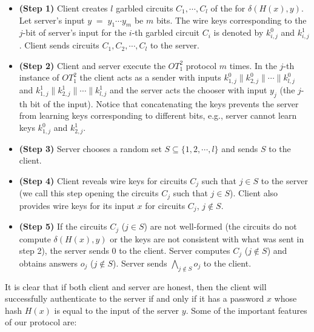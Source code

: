 \begin{itemize}

\item {\bf (Step 1)}  Client creates $l$ garbled circuits $C_1,\cdots,C_l$ of the  for $\delta (H(x), y)$. Let server's 
input $y \; = \; y_1 \cdots y_m$ be $m$ bits. The wire keys corresponding
to the $j$-bit of server's input for the $i$-th garbled circuit $C_i$
is denoted by $k^0_{i,j}$ and $k^1_{i,j}$. Client sends circuits
$C_1,C_2,\cdots,C_l$ to the server.

\item {\bf (Step 2)} Client and server execute the $OT_1^2$ protocol $m$ times. In the $j$-th instance of $OT_1^2$ the
client acts as a sender with inputs $k^0_{1,j} \| k^0_{2,j} \| \cdots
\| k^0_{l,j}$ and $k^1_{1,j} \| k^1_{2,j} \| \cdots \| k^1_{l,j}$ and
the server acts the chooser with input $y_j$ (the $j$-th bit of the
input). Notice that concatenating the keys prevents the server from
learning keys corresponding to different bits, e.g., server cannot
learn keys $k^0_{1,j}$ and $k^1_{2,j}$.

\item {\bf (Step 3)} Server chooses a random set $S \subseteq \{ 1,2, \cdots , l \}$ and sends $S$ to the client.

\item {\bf (Step 4)} Client reveals wire keys for circuits $C_j$ such that $j \in S$ to the server (we call this step opening the
circuits $C_j$ such that $j \in S$). Client also provides wire keys for its input $x$ for circuits $C_j$, $j \not\in S$.

\item {\bf (Step 5)} If the circuits $C_j$ ($j \in S$) are not well-formed (the circuits do not compute $\delta (H(x),y)$ or the 
keys are not consistent with what was sent in step 2), the server
sends $0$ to the client. Server computes $C_j$ ($j \not\in S$) and
obtains answers $o_j$ ($j \not\in S$). Server sends $\bigwedge_{j
\not\in S} o_j$ to the client.

\end{itemize}

It is clear that if both client and server are honest, then the client
will successfully authenticate to the server if and only if it has a
password $x$ whose hash $H(x)$ is equal to the input of the server
$y$. Some of the important features of our protocol are:

